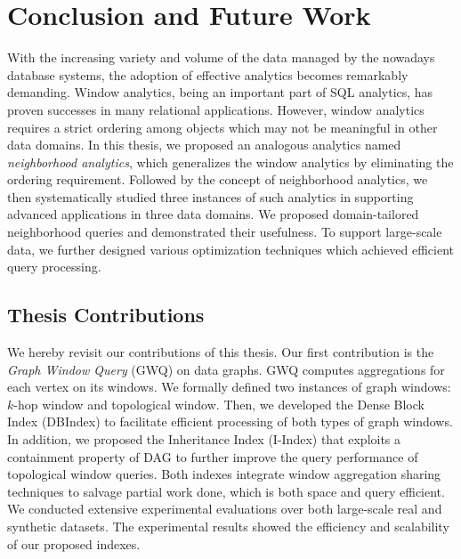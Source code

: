 \chapter{Conclusion and Future Work}
With the increasing variety and volume of the data managed
by the nowadays database systems, the adoption of effective 
analytics becomes remarkably demanding. 
Window analytics, being
an important part of SQL analytics, has proven successes in
many relational applications. However, window analytics requires a
strict ordering among objects which may not be meaningful
in other data domains.  In this thesis, we proposed
an analogous analytics named \emph{neighborhood analytics},
which generalizes the window analytics by eliminating the
ordering requirement. Followed by the concept of
neighborhood analytics, we then systematically studied
three instances of such analytics in supporting advanced applications
in three data domains.
We proposed domain-tailored neighborhood queries and demonstrated
their usefulness. To support large-scale data, 
we further designed various optimization techniques which achieved
efficient query processing.

\section{Thesis Contributions}
We hereby revisit our contributions of this thesis. Our first
contribution is the \emph{Graph Window Query} (GWQ) on data graphs. 
GWQ computes aggregations for each vertex on its windows.
We formally defined two instances of graph windows: $k$-hop window and topological window. 
Then, we developed the Dense Block Index (DBIndex) to facilitate efficient 
processing of both types of graph windows. In addition, 
we proposed the Inheritance Index (I-Index) that exploits a
containment property of DAG to further improve the query performance of topological window queries. 
Both indexes integrate window aggregation sharing techniques to salvage partial work done, 
which is both space and query efficient. 
We conducted extensive experimental evaluations over both large-scale real and synthetic datasets. The experimental results showed the efficiency and scalability of our proposed indexes. 

